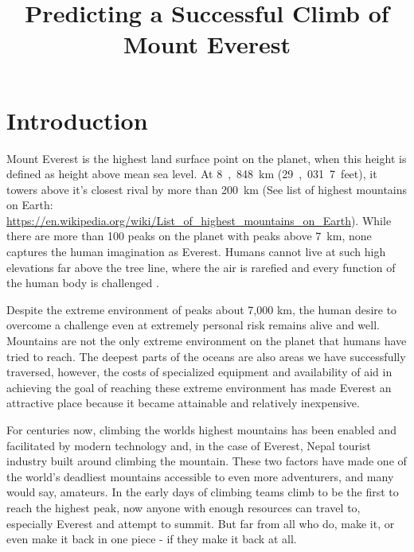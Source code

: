 \documentclass[stu,12pt,floatsintext]{apa7}
\title{Predicting a Successful Climb of Mount Everest} %
\affiliation{University of San Diego}
\begin{document}
\maketitle %


\section{Introduction}
Mount Everest is the highest land surface point on the planet, when this height is defined as height above mean sea level. At \si{8,848~\km} (\si{29,031.7~feet}), it towers above it's closest rival by more than \si{200~\km} (See list of highest mountains on Earth: \url{https://en.wikipedia.org/wiki/List_of_highest_mountains_on_Earth}). While there are more than 100 peaks on the planet with peaks above \si{7~\km}, none captures the human imagination as Everest. Humans cannot live at such high elevations far above the tree line, where the air is rarefied and every function of the human body is challenged \cite{goos_how_2018}. 

Despite the extreme environment of peaks about 7,000 km, the human desire to overcome a challenge even at extremely personal risk remains alive and well. Mountains are not the only extreme environment on the planet that humans have tried to reach. The deepest parts of the oceans are also areas we have successfully traversed, however, the costs of specialized equipment and availability of aid in achieving the goal of reaching these extreme environment has made Everest an attractive place because it became attainable and relatively inexpensive. 

For centuries now, climbing the worlds highest mountains has been enabled and facilitated by modern technology and, in the case of Everest, Nepal tourist industry built around climbing the mountain. These two factors have made one of the world's deadliest mountains accessible to even more adventurers, and many would say, amateurs. In the early days of climbing teams climb to be the first to reach the highest peak, now anyone with enough resources can travel to, especially Everest and attempt to summit. But far from all who do, make it, or even make it back in one piece - if they make it back at all.     
\end{document}
